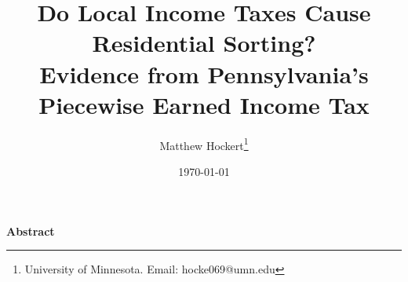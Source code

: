 \documentclass[12pt]{article}
\title{Do Local Income Taxes Cause Residential
Sorting? \\
\large Evidence from Pennsylvania's Piecewise Earned Income Tax}
\author{Matthew Hockert\thanks{University of Minnesota. Email: hocke069@umn.edu}}
\date{\today}
\begin{document}
\maketitle
\thispagestyle{empty}
\vspace{-2em}
\begin{center}\large\textbf{Abstract}\end{center}
\begin{onehalfspace}
\noindent 
\end{onehalfspace}
\end{document}
